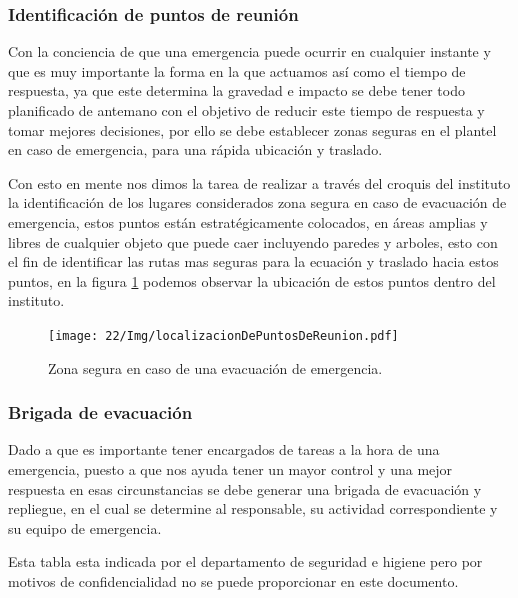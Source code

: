     \subsubsection{Identificación de puntos de reunión}
    
    Con la conciencia de que una emergencia puede ocurrir en cualquier instante y que es muy importante la forma en la que actuamos así como el tiempo de respuesta, ya que este determina la gravedad e impacto se debe tener todo planificado de antemano con el objetivo de reducir este tiempo de respuesta y tomar mejores decisiones, por ello se debe establecer zonas seguras en el plantel en caso de emergencia, para una rápida ubicación y traslado.
    
    Con esto en mente nos dimos la tarea de realizar a través del croquis del instituto la identificación de los lugares considerados zona segura en caso de evacuación de emergencia, estos puntos están estratégicamente colocados, en áreas amplias y libres de cualquier objeto que puede caer incluyendo paredes y arboles, esto con el fin de identificar las rutas mas seguras para la ecuación y traslado hacia estos puntos, en la figura \ref{fig:puntosDeReunión} podemos observar la ubicación de estos puntos dentro del instituto.
    
    
    \begin{figure}[H]
        \centering
         \texttt{[image: 22/Img/localizacionDePuntosDeReunion.pdf]}
        \caption{Zona segura en caso de una evacuación de emergencia.}
        \label{fig:puntosDeReunión}
    \end{figure}
    
    \subsubsection{Brigada de evacuación}
    
    
    
    Dado a que es importante tener encargados de tareas a la hora de una emergencia, puesto a que nos ayuda tener un mayor control y una mejor respuesta en esas circunstancias se debe generar una brigada de evacuación y repliegue, en el cual se determine al responsable, su actividad correspondiente y su equipo de emergencia.
    
    Esta tabla esta indicada por el departamento de seguridad e higiene pero por motivos de confidencialidad no se puede proporcionar en este documento.
    
